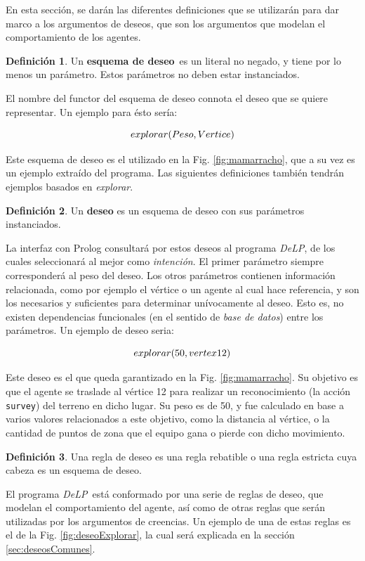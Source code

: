 \documentclass[oneside]{book}
\theoremstyle{definition}
\newtheorem{definicion}{Definición}[section]
\theoremstyle{example}
\newcommand{\DLP}{\mbox{\textit{DeLP}}}
\newcommand{\lit}[1]{\mbox{$ #1$}}
\newcommand{\nlA}[1]{$$\mbox{#1}$$}
\begin{document}
En esta sección, se darán las diferentes definiciones que se utilizarán para dar marco a los
argumentos de deseos, que son los argumentos que modelan el comportamiento de los agentes.

\begin{definicion}
	Un \textbf{esquema de deseo}\ es un literal no negado, y tiene por lo menos 
	un parámetro. Estos parámetros no deben estar instanciados.
\end{definicion}


El nombre del functor del esquema de deseo connota el deseo que se quiere 
representar. Un ejemplo para ésto sería:

\nlA{\lit{explorar(Peso, Vertice)}}

Este esquema de deseo es el utilizado en la Fig. \ref{fig:mamarracho}, que a 
su vez es un ejemplo extraído del programa. Las siguientes definiciones también
tendrán ejemplos basados en \textit{explorar}.

\begin{definicion}
	Un \textbf{deseo} es un esquema de deseo con sus parámetros instanciados.
\end{definicion}

La interfaz con Prolog consultará por estos deseos al programa \DLP, de los 
cuales seleccionará al mejor como \emph{intención}. El primer parámetro 
siempre corresponderá al peso del deseo. Los otros parámetros contienen 
información relacionada, como por ejemplo el vértice o un agente al cual hace 
referencia, y son los necesarios y suficientes para determinar unívocamente al
deseo. Esto es, no existen dependencias funcionales (en el sentido de 
\emph{base de datos}) entre los parámetros. Un ejemplo de deseo seria:

\nlA{\lit{explorar(50, vertex12)}}

Este deseo es el que queda garantizado en la Fig. \ref{fig:mamarracho}. Su 
objetivo es que el agente se traslade al vértice 12 para 
realizar un reconocimiento (la acción \texttt{survey}) del terreno en dicho
lugar. Su peso es de 50, y fue calculado en base a varios valores relacionados
a este objetivo, como la distancia al vértice, o la cantidad de puntos de zona
que el equipo gana o pierde con dicho movimiento.


\begin{definicion}
Una {regla de deseo} es una regla rebatible o una regla estricta cuya cabeza es un esquema 
de deseo.
\end{definicion}

El programa \DLP\ está conformado por una serie de reglas de deseo, que modelan
el comportamiento del agente, así como de otras reglas que serán utilizadas por los 
argumentos de creencias. Un ejemplo de una de estas reglas es el de la Fig. 
\ref{fig:deseoExplorar}, la cual será explicada en la sección \ref{sec:deseosComunes}.
\end{document}
